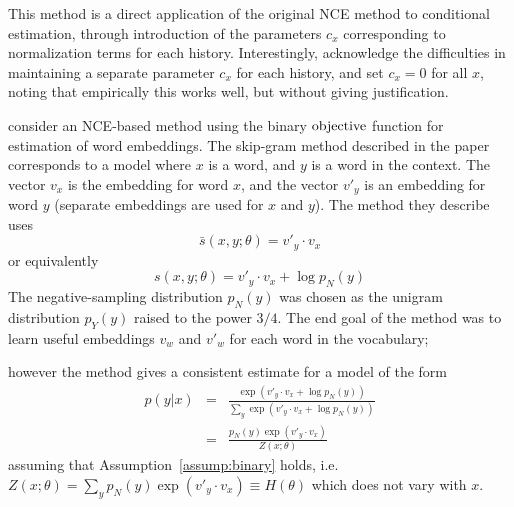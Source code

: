 \documentclass[11pt,a4paper]{article}
\newcommand{\str}[3]{s(#1, #2; #3)}
\newcommand{\ssf}[3]{\bar{s}(#1, #2; #3)}
\newcommand{\commentout}[1]{}
\newcommand{\loss}{\hbox{objective}}
\begin{document}
This method is a direct application of the original NCE method
to conditional estimation, through introduction of the parameters
$c_x$ corresponding to normalization terms for each history. Interestingly,
\citet{mnih2012fast} acknowledge the difficulties in maintaining a
separate parameter $c_x$ for each history, and set $c_x = 0$ for all $x$,
noting that empirically this works well, but without giving justification.




\citet{Mikolov:2013} 
consider an NCE-based method using the binary
$\loss$ function for estimation of word embeddings. The skip-gram method
described in the paper corresponds to a model where $x$ is a word, and
$y$ is a word in the context. The vector $v_x$ is the embedding for
word $x$, and the vector $v'_y$ is an embedding for word $y$ (separate
embeddings are used for $x$ and $y$). The method they describe uses 
\[
\ssf{x}{y}{\theta} = v'_y \cdot v_x
\]
or equivalently
\[
\str{x}{y}{\theta} = v'_y \cdot v_x + \log p_N(y)
\]
The negative-sampling distribution $p_N(y)$ was chosen as the unigram distribution
$p_Y(y)$ raised to the power $3/4$. The end goal of the method was to learn
useful embeddings $v_w$ and $v'_w$ for each word in the vocabulary; 
\commentout{however assuming that Assumption~\ref{assump:binary} holds, the method gives a consistent
estimate for a model of the form
\begin{eqnarray*}
p(y | x) &=& \frac{\exp \left ( v'_y \cdot v_x + \log p_N(y) \right )}{\sum_y \exp \left ( v'_y \cdot v_x + \log p_N(y) \right )}\\
&=&\frac{p_N(y) \exp \left ( v'_y \cdot v_x \right )}{Z(x; \theta)}
\end{eqnarray*}
where $Z(x; \theta) = \sum_y p_N(y) \exp \left ( v'_y \cdot v_x \right
) = H(\theta)$ does not vary with $x$. }
however the method gives a consistent
estimate for a model of the form
\begin{eqnarray*}
p(y | x) &=& \frac{\exp \left ( v'_y \cdot v_x + \log p_N(y) \right )}{\sum_y \exp \left ( v'_y \cdot v_x + \log p_N(y) \right )}\\
&=&\frac{p_N(y) \exp \left ( v'_y \cdot v_x \right )}{Z(x; \theta)}
\end{eqnarray*}
assuming that Assumption~\ref{assump:binary} holds, i.e. $Z(x; \theta) = \sum_y p_N(y) \exp \left ( v'_y \cdot v_x \right
) \equiv H(\theta)$ which does not vary with $x$. 
\end{document}
